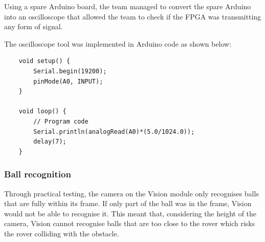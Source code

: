 \documentclass[11pt, a4paper]{article}
\begin{document}
Using a spare Arduino board, the team managed to convert the spare Arduino into an oscilloscope that allowed the team to check if the FPGA was transmitting any form of signal. 

\begin{figure}[!h]
    \centering
    \hfill
    \caption{}
\end{figure}

\pagebreak

The oscilloscope tool was implemented in Arduino code as shown below:
\begin{lstlisting}
    void setup() {
        Serial.begin(19200);
        pinMode(A0, INPUT);
    }

    void loop() {
        // Program code 
        Serial.println(analogRead(A0)*(5.0/1024.0));
        delay(7);
    }
\end{lstlisting}

\subsubsection{Ball recognition}

Through practical testing, the camera on the Vision module only recognises balls that are fully within its frame. If only part of the ball was in the frame, Vision would not be able to recognise it. This meant that, considering the height of the camera, Vision cannot recognise balls that are too close to the rover which risks the rover colliding with the obstacle. 
\end{document}
